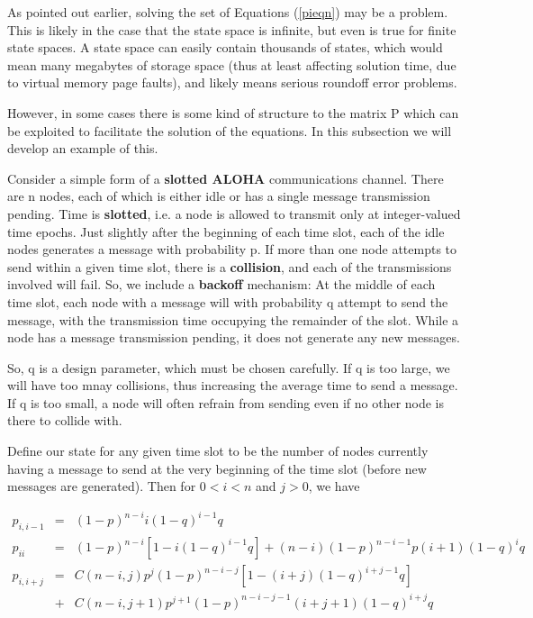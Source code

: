 \documentclass[11pt]{article}
\begin{document}
As pointed out earlier, solving the set of Equations (\ref{pieqn}) may
be a problem. This is likely in the case that the state space is
infinite, but even is true for finite state spaces. A state space can
easily contain thousands of states, which would mean many megabytes of
storage space (thus at least affecting solution time, due to virtual
memory page faults), and likely means serious roundoff error problems.

However, in some cases there is some kind of structure to the matrix P
which can be exploited to facilitate the solution of the equations. In
this subsection we will develop an example of this.

Consider a simple form of a \textbf{slotted ALOHA} communications
channel. There are n nodes, each of which is either idle or has a single
message transmission pending. Time is \textbf{slotted}, i.e. a node is
allowed to transmit only at integer-valued time epochs. Just slightly
after the beginning of each time slot, each of the idle nodes generates
a message with probability p.  If more than one node attempts to send
within a given time slot, there is a \textbf{collision}, and each of the
transmissions involved will fail.  So, we include a {\bf backoff}
mechanism: At the middle of each time slot, each node with a message
will with probability q attempt to send the message, with the
transmission time occupying the remainder of the slot.  While a node has
a message transmission pending, it does not generate any new messages.

So, q is a design parameter, which must be chosen carefully.  If q is
too large, we will have too mnay collisions, thus increasing the average
time to send a message.  If q is too small, a node will often refrain
from sending even if no other node is there to collide with.

Define our state for any given time slot to be the number of nodes currently
having a message to send at the very beginning of the time slot (before new
messages are generated). Then for $0 < i < n$ and $j > 0$, we have

\begin{eqnarray}
p_{i,i-1} & = & (1-p)^{n-i}i(1-q)^{i-1}q\label{aloha} \\
p_{ii} & = & (1-p)^{n-i}[1-i(1-q)^{i-1}q]+(n-i)(1-p)^{n-i-1}p(i+1)(1-q)^{i}q\\
p_{i,i+j} & = & C(n-i,j)p^{j}(1-p)^{n-i-j}[1-(i+j)(1-q)^{i+j-1}q]\\
 & + & C(n-i,j+1)p^{j+1}(1-p)^{n-i-j-1}(i+j+1)(1-q)^{i+j}q
\end{eqnarray}
\end{document}
